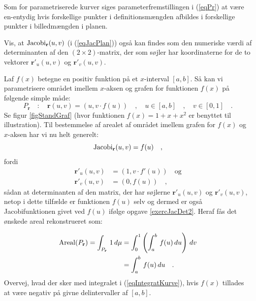 \begin{definition} \label{defEnEnParamPlan}
Som for parametriserede kurver siges parameterfremstillingen i
(\ref{eqPr}) at være {en-entydig} hvis forskellige punkter i
definitionsmængden afbildes i forskellige punkter i billedmængden i
planen.
\end{definition}



\begin{exercise} \label{exercJacDet2}
Vis, at $\operatorname{Jacobi}_{\bf r}(u,v)$ (i (\ref{eqJacPlan})) også kan findes som den numeriske
værdi af determinanten af den $(2 \times 2)$-matrix, der som søjler har
koordinaterne for de to vektorer $\mathbf{r}'_{u}(u,v)$ og  $\mathbf{r}'_{v}(u,v)$.
\end{exercise}

\begin{example} \label{exampStandGraf}
Laf $f(x)$ betegne en positiv funktion på et $x$-interval $[a, b]$. Så kan vi parametrisere området imellem
$x$-aksen og grafen for funktionen $f(x)$ på følgende simple måde:
\begin{equation}
P_{\mathbf{r}} \quad : \quad \mathbf{r}(u,v) = (u, v \cdot f(u)) \quad , \quad  u\in [a, b] \quad , \quad v \in [0, 1] \quad.
\end{equation}
Se figur \ref{figStandGraf} (hvor funktionen $f(x) = 1 + x + x^{2}$ er benyttet til illustration).
Til bestemmelse af arealet af området imellem grafen for $f(x)$ og $x$-aksen har vi nu helt generelt:
\begin{equation}
\operatorname{Jacobi}_{\mathbf{r}}(u,v) = f(u) \quad ,
\end{equation}
fordi
\begin{equation}
\begin{aligned}
\mathbf{r}'_{u}(u,v) &= (1, v\cdot f'(u)) \quad \textrm{og} \\
\mathbf{r}'_{v}(u,v) &= (0, f(u)) \quad ,
\end{aligned}
\end{equation}
sådan at determinanten af den matrix, der har søjlerne $\mathbf{r}'_{u}(u,v)$ og $\mathbf{r}'_{v}(u,v)$, netop i dette tilfælde er funktionen $f(u)$ selv og dermed er også Jacobifunktionen givet ved $f(u)$ ifølge opgave \ref{exercJacDet2}. Heraf fås det ønskede areal rekonstrueret  som:

\begin{equation}\label{eqIntegratKurve}
\begin{aligned}
\operatorname{Areal}(P_{\mathbf{r}}) = \int_{P_{\mathbf{r}}}\, 1 \, d\mu &= \int_{0}^{1} \left( \int_{a}^{b} \,f(u) \, du \right) \, dv \\
&= \int_{a}^{b}\,f(u) \, du \quad.
\end{aligned}
\end{equation}
Overvej, hvad der sker med integralet i (\ref{eqIntegratKurve}), hvis $f(x)$ tillades at være negativ på givne delintervaller af $[a, b]$.
\end{example}




